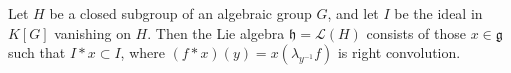 Let $H$ be a closed subgroup of an algebraic group $G$, and let $I$ be the ideal in $K[G]$ vanishing on $H$. Then the Lie algebra $\mathfrak{h} = \mathcal{L}(H)$ consists of those $x \in \mathfrak{g}$ such that $I * x \subset I$, where $(f * x)(y) = x(\lambda_{y^{-1}} f)$ is right convolution.
